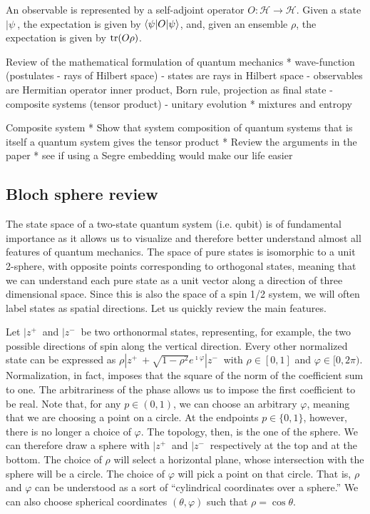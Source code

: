 \renewcommand{\thepostulate}{Meas}
\begin{postulate}\label{rp_qm_postMeas}
	An observable is represented by a self-adjoint operator $O : \mathcal{H} \to \mathcal{H}$. Given a state $|\psi\>$, the expectation is given by $\langle\psi | O | \psi \rangle$, and, given an ensemble $\rho$, the expectation is given by $\operatorname{tr}(O\rho)$.
\end{postulate}
\renewcommand{\thepostulate}{\Roman{assump}}



Review of the mathematical formulation of quantum mechanics
* wave-function (postulates - rays of Hilbert space)
- states are rays in Hilbert space
- observables are Hermitian operator inner product, Born rule, projection as final state
- composite systems (tensor product)
- unitary evolution
* mixtures and entropy

Composite system
* Show that system composition of quantum systems that is itself a quantum system gives the tensor product
* Review the arguments in the paper
* see if using a Segre embedding would make our life easier

\subsection{Bloch sphere review}

The state space of a two-state quantum system (i.e. qubit) is of fundamental importance as it allows us to visualize and therefore better understand almost all features of quantum mechanics. The space of pure states is isomorphic to a unit 2-sphere, with opposite points corresponding to orthogonal states, meaning that we can understand each pure state as a unit vector along a direction of three dimensional space. Since this is also the space of a spin 1/2 system, we will often label states as spatial directions. Let us quickly review the main features.

Let $|z^+\>$ and $|z^-\>$ be two orthonormal states, representing, for example, the two possible directions of spin along the vertical direction. Every other normalized state can be expressed as $\rho |z^+\> + \sqrt{1-\rho^2}e^{\imath \varphi} |z^-\>$ with $\rho \in [0,1]$ and $\varphi \in [0,2\pi)$. Normalization, in fact, imposes that the square of the norm of the coefficient sum to one. The arbitrariness of the phase allows us to impose the first coefficient to be real. Note that, for any $p \in (0,1)$, we can choose an arbitrary $\varphi$, meaning that we are choosing a point on a circle. At the endpoints $p \in \{0,1\}$, however, there is no longer a choice of $\varphi$. The topology, then, is the one of the sphere. We can therefore draw a sphere with $|z^+\>$ and $|z^-\>$ respectively at the top and at the bottom. The choice of $\rho$ will select a horizontal plane, whose intersection with the sphere will be a circle. The choice of $\varphi$ will pick a point on that circle. That is, $\rho$ and $\varphi$ can be understood as a sort of ``cylindrical coordinates over a sphere.'' We can also choose spherical coordinates $(\theta, \varphi)$ such that $\rho = \cos \theta$.

